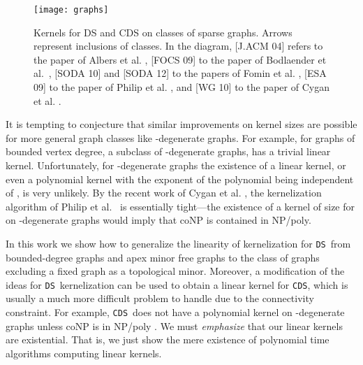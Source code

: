 \documentclass[11pt]{article}
\newcommand{\tDS}{{\texttt{\sc DS}}}
\newcommand{\tCDS}{{\texttt{\sc CDS}}}
\begin{document}
\begin{figure}[t]
\begin{center}
\texttt{[image: graphs]}
\caption{Kernels for DS and CDS on classes of sparse graphs. Arrows represent inclusions of classes.
In the diagram, [J.ACM 04] refers to the paper of Albers et al. \cite{AlberFN04}, [FOCS 09]   to the paper of Bodlaender et al.~\cite{H.Bodlaender:2009ng},
[SODA 10] and [SODA 12] to the papers of Fomin et al. \cite{F.V.Fomin:2010oq,F.V.Fomin:2012},  [ESA 09] to the paper of Philip et al. \cite{PhilipRS09}, and  [WG 10] to the paper of Cygan et al. \cite{Cygan:2010bv}. }
\label{fig:graph_classes}
\end{center}
\end{figure}

 
 It is tempting to conjecture that similar improvements on kernel sizes are possible for more general graph classes like -degenerate graphs. For example, for graphs of bounded vertex degree, a subclass of -degenerate graphs,  has a trivial linear kernel. Unfortunately,  for -degenerate graphs the existence of a linear kernel, or even a polynomial kernel with the exponent of the polynomial being independent of , is very unlikely. 
   By the recent work of   Cygan et al. \cite{CyganGH12}, the kernelization algorithm of Philip et al.~\cite{PhilipRS09}  is essentially  tight---the existence of a kernel of size  
  for   on -degenerate  graphs would imply that  {\sf coNP} is contained in {\sf NP/poly}.  
 
 In this work we show how to generalize the linearity of kernelization  for \tDS \, from 
 bounded-degree graphs and  apex minor free graphs to the class of graphs excluding a fixed graph  as a topological minor.
  Moreover, a   modification of the ideas for \tDS \, kernelization can be used to obtain a linear kernel for \tCDS, which is usually a much more difficult problem to handle due to the connectivity constraint.  For example, \tCDS \, does not have a polynomial kernel on -degenerate graphs  unless {\sf coNP} is in {\sf NP/poly}    \cite{Cygan:2010bv}. We must {\em emphasize} that our linear kernels are existential. That is, we just show the mere existence of polynomial time algorithms computing linear kernels. 
  
\end{document}
